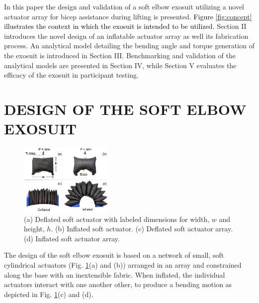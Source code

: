 \documentclass[letterpaper, 10 pt, conference]{ieeeconf}  %
\begin{document}
 In this paper the design and validation of a soft elbow exosuit utilizing a novel actuator array for bicep assistance during lifting is presented. \textcolor{black}{Figure \ref{fig:concept} illustrates the context in which the exosuit  is intended to be utilized.} Section II introduces the novel design of an inflatable actuator array as well its fabrication process.  An analytical model detailing the bending angle and torque generation of the exosuit is introduced in Section III.   Benchmarking and validation of the analytical models are presented in Section IV, while Section V evaluates the efficacy of the exosuit in participant testing.  

\section{DESIGN OF THE SOFT ELBOW EXOSUIT}


\begin{figure}[t]
\centering
\includegraphics[width=0.4\textwidth]{V1_device.PNG}
\caption{(a) Deflated soft actuator with labeled dimensions for width, $w$ and height, $h$. (b) Inflated soft actuator. (c) Deflated soft actuator array. (d) Inflated soft actuator array.
}

\label{fig:array}
\end{figure}

The design of the soft elbow exosuit is based on a network of small, soft cylindrical actuators (Fig. \ref{fig:array}(a) and (b)) arranged in an array and constrained along the base with an inextensible fabric. When inflated, the individual actuators interact with one another other, to produce a bending motion as depicted in Fig. \ref{fig:array}(c) and (d).  
\end{document}

